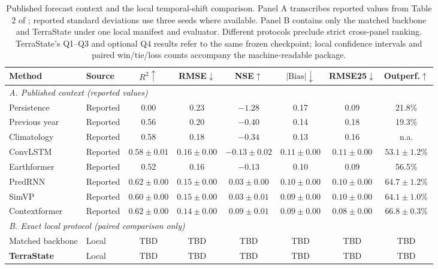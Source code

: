 \documentclass[letterpaper]{article} %
\begin{document}
\begin{table}[t]
\centering
\small
\setlength{\tabcolsep}{2.0pt}
\begin{tabular}{llcccccc}
\toprule
Method & Source & $R^2\uparrow$ & RMSE$\downarrow$ & NSE$\uparrow$ &
$|\mathrm{Bias}|\downarrow$ & RMSE25$\downarrow$ & Outperf.$\uparrow$\\
\midrule
\multicolumn{8}{l}{\emph{A. Published context (reported values)}}\\
Persistence & Reported & 0.00 & 0.23 & $-1.28$ & 0.17 & 0.09 & 21.8\%\\
Previous year & Reported & 0.56 & 0.20 & $-0.40$ & 0.14 & 0.18 & 19.3\%\\
Climatology & Reported & 0.58 & 0.18 & $-0.34$ & 0.13 & 0.16 & n.a.\\
ConvLSTM & Reported & $0.58{\pm}0.01$ & $0.16{\pm}0.00$ &
$-0.13{\pm}0.02$ & $0.11{\pm}0.00$ & $0.11{\pm}0.00$ &
$53.1{\pm}1.2$\%\\
Earthformer & Reported & 0.52 & 0.16 & $-0.13$ & 0.10 & 0.09 & 56.5\%\\
PredRNN & Reported & $0.62{\pm}0.00$ & $0.15{\pm}0.00$ &
$0.03{\pm}0.00$ & $0.10{\pm}0.00$ & $0.10{\pm}0.00$ &
$64.7{\pm}1.2$\%\\
SimVP & Reported & $0.60{\pm}0.00$ & $0.15{\pm}0.00$ &
$0.03{\pm}0.01$ & $0.09{\pm}0.00$ & $0.10{\pm}0.00$ &
$64.1{\pm}1.0$\%\\
Contextformer & Reported & $0.62{\pm}0.00$ & $0.14{\pm}0.00$ &
$0.09{\pm}0.01$ & $0.09{\pm}0.00$ & $0.08{\pm}0.00$ &
$66.8{\pm}0.3$\%\\
\midrule
\multicolumn{8}{l}{\emph{B. Exact local protocol (paired comparison only)}}\\
Matched backbone & Local & TBD & TBD & TBD & TBD & TBD & TBD\\
\textbf{TerraState} & Local & TBD & TBD & TBD & TBD & TBD & TBD\\
\bottomrule
\end{tabular}
\caption{Published forecast context and the local temporal-shift comparison.
Panel A transcribes reported values from Table 2 of
\citet{benson2024multimodal}; reported standard deviations use three seeds
where available. Panel B contains only the matched backbone and TerraState under one
local manifest and evaluator. Different protocols preclude strict cross-panel
ranking. TerraState's Q1--Q3 and optional Q4 results refer to the same frozen
checkpoint; local confidence intervals and paired win/tie/loss counts accompany
the machine-readable package.}
\label{tab:forecast}
\end{table}
\end{document}

